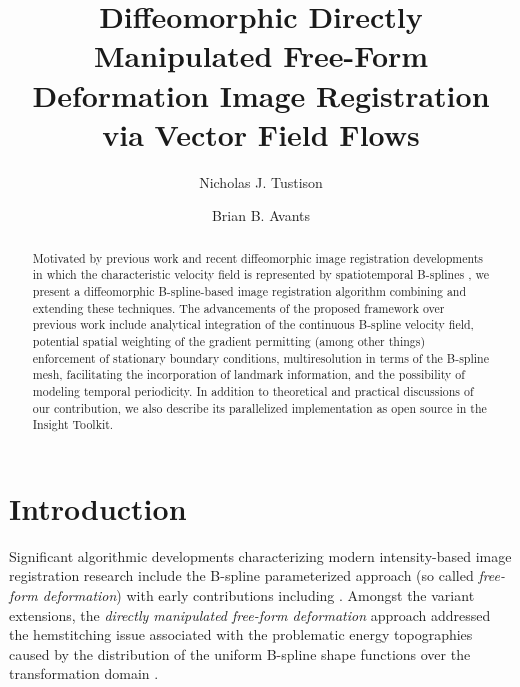\documentclass{llncs}
\begin{document}
%
\frontmatter          %
%

\mainmatter              %
%
\title{Diffeomorphic Directly Manipulated Free-Form Deformation Image Registration via Vector Field Flows}
%
%
\author{Nicholas J. Tustison \and Brian B. Avants}
%
%


\maketitle              %

\begin{abstract}
Motivated by previous work \cite{tustison2009} and 
recent diffeomorphic image registration developments in which the 
characteristic velocity field is represented by spatiotemporal B-splines 
\cite{de-craene2011}, we present a diffeomorphic B-spline-based
image registration algorithm combining and extending these techniques.  
The advancements of the proposed framework
over previous work include analytical integration of
the continuous B-spline velocity field, potential spatial weighting 
of the gradient permitting (among other things) enforcement of 
stationary boundary conditions, multiresolution in terms of the B-spline
mesh, facilitating the incorporation of landmark information, 
and the possibility of modeling temporal periodicity.  In addition to
theoretical and practical discussions of our contribution, we also describe 
its parallelized implementation as open source in the Insight Toolkit.  
\end{abstract}

\section{Introduction}
Significant algorithmic developments characterizing modern intensity-based
image registration research include the B-spline parameterized approach
(so called {\em free-form deformation}) with early contributions 
including \cite{szeliski1997,thevenaz1998,rueckert1999}.  Amongst the 
variant extensions, the 
{\em directly manipulated free-form deformation} approach  
 addressed the hemstitching issue associated with the
problematic energy topographies caused by the distribution of the uniform 
B-spline shape functions over the transformation domain \cite{tustison2009}.
\end{document}
